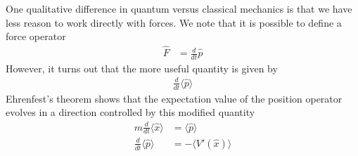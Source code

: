 \documentclass[book.tex]{subfiles}
\begin{document}
One qualitative difference in quantum versus classical mechanics is that we have less reason to work directly with forces. We note that it is possible to define a force operator
\begin{align}
\hat{F} &= \frac{d}{dt} \hat{p}
\end{align}
However, it turns out that the more useful quantity is given by
\begin{align}
    \frac{d}{dt} \langle \hat {p} \rangle
\end{align}
Ehrenfest's theorem shows that the expectation value of the position operator evolves in a direction controlled by this modified quantity
\begin{align}
    m \frac{d}{dt} \langle \hat{x} \rangle &= \langle \hat{p} \rangle  \\
    \frac{d}{dt} \langle \hat{p} \rangle &= - \langle V'(\hat{x}) \rangle
\end{align}
\end{document}
